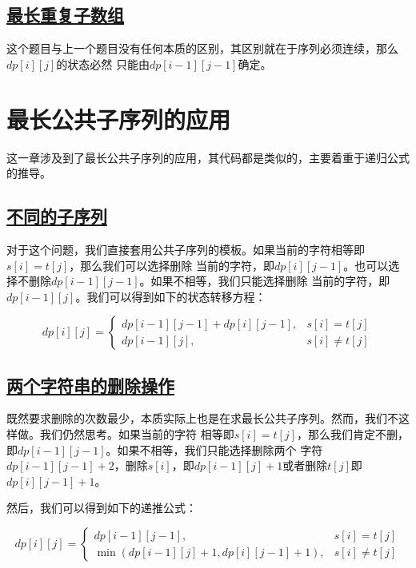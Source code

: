 \documentclass[../../main.tex]{subfiles}
\begin{document}
\subsection{\href{https://leetcode.cn/problems/maximum-length-of-repeated-subarray/}{最长重复子数组}}

这个题目与上一个题目没有任何本质的区别，其区别就在于序列必须连续，那么$dp[i][j]$的状态必然
只能由$dp[i - 1][j - 1]$确定。



\section{最长公共子序列的应用}

这一章涉及到了最长公共子序列的应用，其代码都是类似的，主要着重于递归公式的推导。

\subsection{\href{https://leetcode.cn/problems/distinct-subsequences/}{不同的子序列}}

对于这个问题，我们直接套用公共子序列的模板。如果当前的字符相等即$s[i] = t[j]$，那么我们可以选择删除
当前的字符，即$dp[i][j - 1]$。也可以选择不删除$dp[i - 1][j -1]$。如果不相等，我们只能选择删除
当前的字符，即$dp[i - 1][j]$。我们可以得到如下的状态转移方程：

$$
dp[i][j] = \begin{cases}
  dp[i - 1][j - 1] + dp[i][j - 1], & s[i] = t[j] \\
  dp[i - 1][j], & s[i] \neq t[j]
\end{cases}
$$

\subsection{\href{https://leetcode.cn/problems/delete-operation-for-two-strings/}{两个字符串的删除操作}}

既然要求删除的次数最少，本质实际上也是在求最长公共子序列。然而，我们不这样做。我们仍然思考。如果当前的字符
相等即$s[i] = t[j]$，那么我们肯定不删，即$dp[i - 1][j - 1]$。如果不相等，我们只能选择删除两个
字符$dp[i - 1][j - 1] + 2$，删除$s[i]$，即$dp[i - 1][j] + 1$或者删除$t[j]$即$dp[i][j - 1] + 1$。

然后，我们可以得到如下的递推公式：

$$
dp[i][j] = \begin{cases}
  dp[i - 1][j - 1] , & s[i] = t[j] \\
  \min(dp[i - 1][j] + 1, dp[i][j - 1] + 1), & s[i] \neq t[j]
\end{cases}
$$
\end{document}
